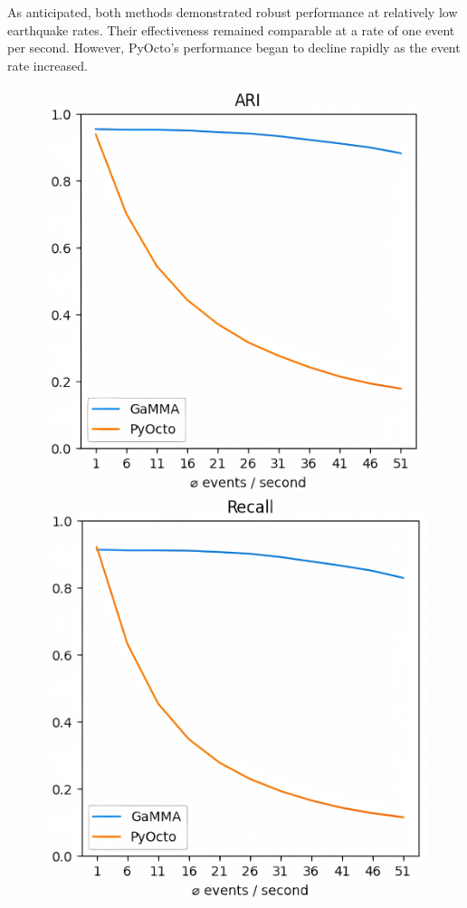 \documentclass{scrreprt}
\begin{document}
As anticipated, both methods demonstrated robust performance at relatively low earthquake rates. Their effectiveness remained comparable at a rate of one event per second. However, PyOcto's performance began to decline rapidly as the event rate increased.

\begin{figure}[ht]
    \centering
    \begin{minipage}{0.42\textwidth}
        \centering
        \includegraphics[width=\textwidth]{plots/performance_comparison_ari.png}
    \end{minipage}
    \hfill
    \begin{minipage}{0.42\textwidth}
        \centering
        \includegraphics[width=\textwidth]{plots/performance_comparison_recall.png}

\end{minipage}
\end{figure}
\end{document}
